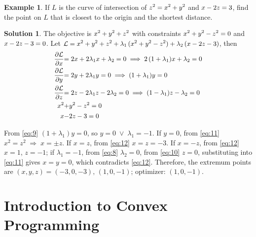 \documentclass[10pt]{beamer}
\newcommand{\ds}{\displaystyle}
\newcommand{\ie}{\;\Longrightarrow\;}
\newcommand{\orr}{\;\vee\;}
\theoremstyle{definition}
\newtheorem*{ex}{Example}
\newtheorem*{sol}{Solution}
\newcommand{\pdiff}[2]{\frac{\partial #1}{\partial #2}}
\newcommand\scalemath[2]{\scalebox{#1}{\mbox{\ensuremath{\displaystyle #2}}}}
\begin{document}
\begin{frame}
  \begin{ex}
    If $L$ is the curve of intersection of $\scalemath{0.95}{z^2 = x^2 + y^2}$ and $\scalemath{0.95}{x - 2z = 3}$, find the point on $L$ that is closest to the origin and the shortest distance. 
  \end{ex}

  \begin{sol}
    The objective is $\scalemath{0.95}{x^2 + y^2 + z^2}$ with constraints $\scalemath{0.95}{x^2 + y^2 - z^2 = 0}$ and $\scalemath{0.95}{x - 2z - 3 = 0}$. Let $\ds\scalemath{0.95}{\mathcal{L} = x^2 + y^2 + z^2 + \lambda_1\,(x^2 + y^2 - z^2) + \lambda_2\,(x - 2z - 3)}$, then \vspace{-3mm}
    \begin{align}
      \scalemath{0.95}{\pdiff{\mathcal{L}}{x}} &\scalemath{0.95}{= 2 x + 2\lambda_1 x + \lambda_2 = 0 \ie 2\,(1 + \lambda_1) x + \lambda_2 = 0}\label{eq:8}\\
      \scalemath{0.95}{\pdiff{\mathcal{L}}{y}} &\scalemath{0.95}{= 2 y + 2\lambda_1 y = 0 \ie (1 + \lambda_1)y = 0}\label{eq:9} \\
      \scalemath{0.95}{\pdiff{\mathcal{L}}{z}} &\scalemath{0.95}{= 2 z - 2\lambda_1 z - 2\lambda_2 = 0 \ie (1 - \lambda_1)z - \lambda_2 = 0}\label{eq:10}\\
      \scalemath{0.95}{x^2} &\scalemath{0.95}{+ y^2 - z^2 = 0}\label{eq:11} \\
      \scalemath{0.95}{x} &\scalemath{0.95}{- 2z - 3 = 0}\label{eq:12}
    \end{align}
    
    \vspace{-3mm}
    From \eqref{eq:9} $(1 + \lambda_1) y = 0$, so $y = 0\orr\lambda_1 = -1$. If $y = 0$, from \eqref{eq:11} $x^2 = z^2 \ie x = \pm z$. If $x = z$, from \eqref{eq:12} $x = z = -3$. If $x = -z$, from \eqref{eq:12} $x = 1$, $z = -1$; if $\lambda_1 = -1$, from \eqref{eq:8} $\lambda_2 = 0$, from \eqref{eq:10} $z = 0$, substituting into \eqref{eq:11} gives $x = y = 0$, which contradicts \eqref{eq:12}. Therefore, the extremum points are $(x, y, z) = (-3, 0, -3),\,(1, 0, -1)$; optimizer: $(1, 0, -1)$.
  \end{sol}
\end{frame}

\section{Introduction to Convex Programming}
\end{document}
